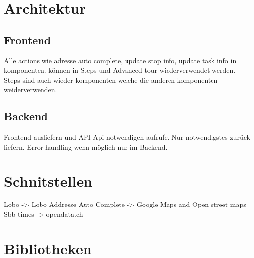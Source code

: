 \section{Architektur}

\subsection{Frontend}
Alle actions wie adresse auto complete, update stop info, update task info in komponenten. können in Steps und Advanced tour wiederverwendet werden. Steps sind auch wieder komponenten welche die anderen komponenten weiderverwenden.

\subsection{Backend}
Frontend ausliefern und API
Api notwendigen aufrufe. Nur notwendigstes zurück liefern. Error handling wenn möglich nur im Backend.

\section{Schnitstellen}
Lobo -> Lobo
Addresse Auto Complete -> Google Maps and Open street maps
Sbb times -> opendata.ch


\section{Bibliotheken}










